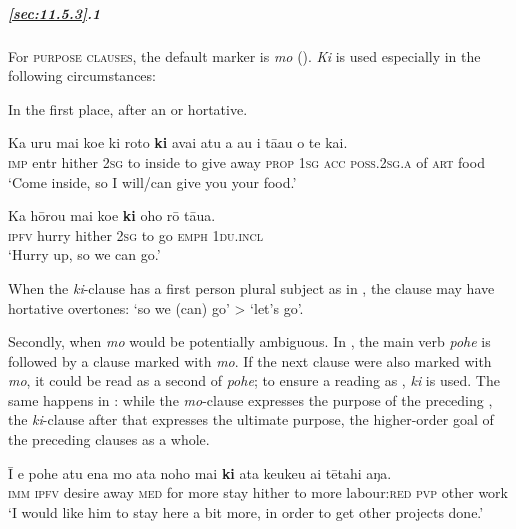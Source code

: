 \subparagraph{\ref{sec:11.5.3}.1} For \textsc{purpose clauses}, the default marker is \textit{mo} (). \textit{Ki} is used especially in the following circumstances:

In the first place, after an  or hortative. 

\ea\label{ex:11.186}
\gll Ka uru mai koe ki roto \textbf{ki} {\ꞌ}avai atu a au i tā{\ꞌ}au o te kai. \\
\textsc{imp} entr hither \textsc{2sg} to inside to give away \textsc{prop} \textsc{1sg} \textsc{acc} \textsc{poss.2sg.a} of \textsc{art} food \\

\glt 
‘Come inside, so I will/can give you your food.’ \textstyleExampleref{[R229.417]} 
\z

\ea\label{ex:11.187}
\gll Ka hōrou mai koe \textbf{ki} oho rō tāua. \\
\textsc{ipfv} hurry hither \textsc{2sg} to go \textsc{emph} \textsc{1du.incl} \\

\glt
‘Hurry up, so we can go.’ \textstyleExampleref{[R313.109]} 
\z

When the \textit{ki}{}-clause has a first person plural subject as in , the clause may have hortative overtones: ‘so we (can) go’ {\textgreater} ‘let’s go’.

Secondly, when \textit{mo} would be potentially ambiguous. In , the main verb \textit{pohe} is followed by a  clause marked with \textit{mo}. If the next clause were also marked with \textit{mo}, it could be read as a second  of \textit{pohe}; to ensure a reading as , \textit{ki} is used. The same happens in : while the \textit{mo}{}-clause expresses the purpose of the preceding , the \textit{ki}{}-clause after that expresses the ultimate purpose, the higher-order goal of the preceding clauses as a whole.

\ea\label{ex:11.188}
\gll {\ꞌ}Ī e pohe atu ena mo {\ꞌ}ata noho mai \textbf{ki} {\ꞌ}ata keukeu ai tētahi aŋa.\\
\textsc{imm} \textsc{ipfv} desire away \textsc{med} for more stay hither to more labour:\textsc{red} \textsc{pvp} other work\\

\glt 
‘I would like him to stay here a bit more, in order to get other projects done.’ \textstyleExampleref{[R204.005]} 
\z

